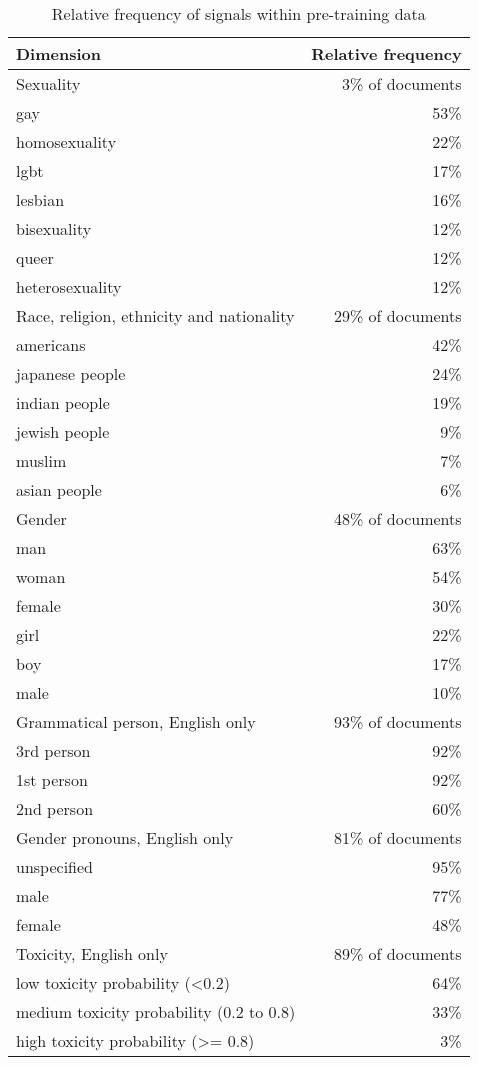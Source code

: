 \begin{table}[H]
\centering
\small
\caption{Relative frequency of signals within pre-training data}
\begin{tabular}{lr}
\toprule
Dimension & Relative frequency \\
\midrule
Sexuality & 3\% of documents \\
\verythinrule
gay & 53\% \\
homosexuality & 22\% \\
lgbt & 17\% \\
lesbian & 16\% \\
bisexuality & 12\% \\
queer & 12\% \\
heterosexuality & 12\% \\
\midrule
Race, religion, ethnicity and nationality & 29\% of documents \\
\verythinrule
americans & 42\% \\
japanese people & 24\% \\
indian people & 19\% \\
jewish people & 9\% \\
muslim & 7\% \\
asian people & 6\% \\
\midrule
Gender & 48\% of documents \\
\verythinrule
man & 63\% \\
woman & 54\% \\
female & 30\% \\
girl & 22\% \\
boy & 17\% \\
male & 10\% \\
\midrule
Grammatical person, English only & 93\% of documents \\
\verythinrule
3rd person & 92\% \\
1st person & 92\% \\
2nd person & 60\% \\
\midrule
Gender pronouns, English only & 81\% of documents \\
\verythinrule
unspecified & 95\% \\
male & 77\% \\
female & 48\% \\
\midrule
Toxicity, English only & 89\% of documents \\
\verythinrule
low toxicity probability (<0.2) & 64\% \\
medium toxicity probability (0.2 to 0.8) & 33\% \\
high toxicity probability (>= 0.8) & 3\% \\
\bottomrule
\end{tabular}

\label{tab:rai-dataset-analysis-counts}
\end{table}


